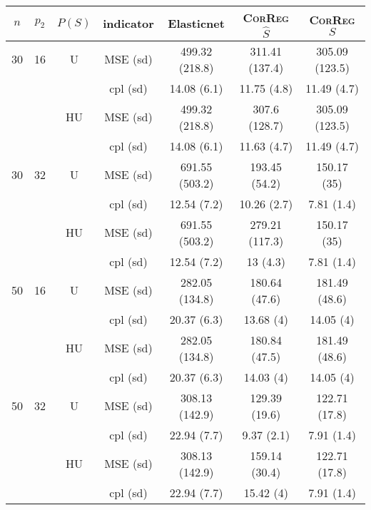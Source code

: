 \documentclass[11pt,a4paper]{article}
\begin{document}
\begin{table}[h!]
\centering
\begin{tabular}{|c|c|c|c|c|c|c|}
\hline 
$n$ & $p_2$&  $P(S)$ &indicator & Elasticnet  &    \textsc{CorReg} $\hat S$& \textsc{CorReg} $S$\\ 
\hline %
30 & 16 & U&MSE (sd) & 499.32 (218.8) & 311.41 (137.4) & 305.09 (123.5) \\
& & & cpl (sd) & 14.08 (6.1) & 11.75 (4.8) & 11.49 (4.7) \\
 &  &HU &MSE (sd) & 499.32 (218.8) & 307.6 (128.7) & 305.09 (123.5) \\
& & & cpl (sd) & 14.08 (6.1) & 11.63 (4.7) & 11.49 (4.7) \\
\hline %
30 & 32 & U & MSE (sd) & 691.55 (503.2) & 193.45 (54.2) & 150.17 (35) \\
& & & cpl (sd) & 12.54 (7.2) & 10.26 (2.7) & 7.81 (1.4) \\
 &  & HU & MSE (sd) & 691.55 (503.2) & 279.21 (117.3) & 150.17 (35) \\
& & & cpl (sd) & 12.54 (7.2) & 13 (4.3) & 7.81 (1.4) \\
\hline
\hline %
50 & 16 & U&	MSE (sd) & 282.05 (134.8) & 180.64 (47.6) & 181.49 (48.6) \\
& & & cpl (sd) & 20.37 (6.3) & 13.68 (4) & 14.05 (4) \\
 &  &HU &MSE (sd) & 282.05 (134.8) & 180.84 (47.5) & 181.49 (48.6) \\
& & & cpl (sd) & 20.37 (6.3) & 14.03 (4) & 14.05 (4) \\
\hline %
50 & 32 & U&MSE (sd) & 308.13 (142.9) & 129.39 (19.6) & 122.71 (17.8) \\
& & & cpl (sd) & 22.94 (7.7) & 9.37 (2.1) & 7.91 (1.4) \\
 &  &HU &MSE (sd) & 308.13 (142.9) & 159.14 (30.4) & 122.71 (17.8) \\
& & &cpl (sd) & 22.94 (7.7) & 15.42 (4) & 7.91 (1.4) \\

\end{tabular}
\end{table}
\end{document}
